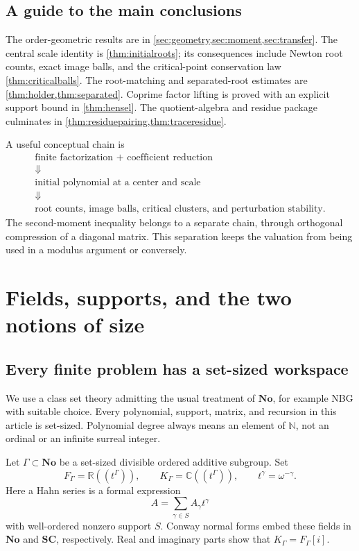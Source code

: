 \documentclass[11pt,letterpaper]{article}
\numberwithin{equation}{section}
\theoremstyle{definition}
\theoremstyle{remark}\newtheorem{remark}[theorem]{Remark}
\newcommand{\No}{\mathbf{No}}
\newcommand{\SC}{\mathbf{SC}}
\newcommand{\C}{\mathbb C}
\newcommand{\R}{\mathbb R}
\newcommand{\N}{\mathbb N}
\begin{document}
\subsection{A guide to the main conclusions}
The order-geometric results are in \cref{sec:geometry,sec:moment,sec:transfer}.
The central scale identity is \cref{thm:initialroots}; its consequences include
Newton root counts, exact image balls, and the critical-point conservation
law \cref{thm:criticalballs}. The root-matching and separated-root estimates
are \cref{thm:holder,thm:separated}. Coprime factor lifting is proved with
an explicit support bound in \cref{thm:hensel}. The quotient-algebra and
residue package culminates in \cref{thm:residuepairing,thm:traceresidue}.

A useful conceptual chain is
\[
\begin{gathered}
\text{finite factorization + coefficient reduction}\\
\Downarrow\\
\text{initial polynomial at a center and scale}\\
\Downarrow\\
\text{root counts, image balls, critical clusters, and perturbation stability}.
\end{gathered}
\]
The second-moment inequality belongs to a separate chain, through
orthogonal compression of a diagonal matrix. This separation keeps the
valuation from being used in a modulus argument or conversely.

\section{Fields, supports, and the two notions of size}\label{sec:foundations}

\subsection{Every finite problem has a set-sized workspace}
We use a class set theory admitting the usual treatment of $\No$, for example
NBG with suitable choice. Every polynomial, support, matrix, and recursion
in this article is set-sized. Polynomial degree always means an element of
$\N$, not an ordinal or an infinite surreal integer.

Let $\Gamma\subset\No$ be a set-sized divisible ordered additive subgroup.
Set
\[
 F_\Gamma=\R((t^\Gamma)),\qquad
 K_\Gamma=\C((t^\Gamma)),\qquad t^\gamma=\omega^{-\gamma}.
\]
Here a Hahn series is a formal expression
\[
 A=\sum_{\gamma\in S}A_\gamma t^\gamma
\]
with well-ordered nonzero support $S$. Conway normal forms embed these fields
in $\No$ and $\SC$, respectively. Real and imaginary parts show that
$K_\Gamma=F_\Gamma[i]$.
\end{document}
